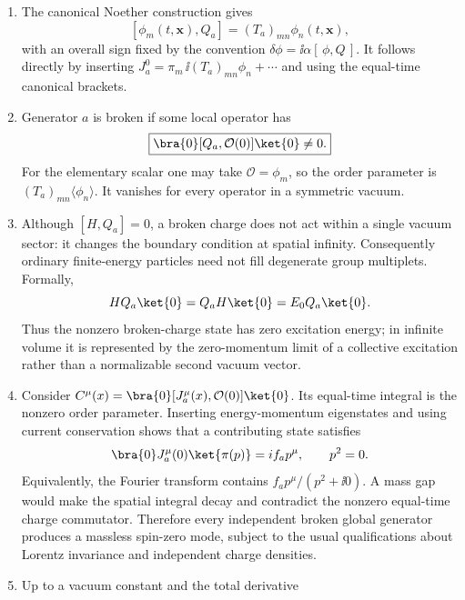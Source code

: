 
\begin{enumerate}
  \begin{enumerate}
    \item[(a)] The canonical Noether construction gives
      \[
        [\phi_m(t,\mathbf x),Q_a]=(T_a)_{mn}\phi_n(t,\mathbf x),
      \]
      with an overall sign fixed by the convention
      \(\delta\phi=\ii\alpha[\,\phi,Q\,]\).  It follows directly by inserting
      \(J^0_a=\pi_m\,\ii(T_a)_{mn}\phi_n+\cdots\) and using the equal-time
      canonical brackets.
    \item[(b)] Generator \(a\) is broken if some local operator has
      \[
        \boxed{\bra{0}[Q_a,\mathcal O(0)]\ket{0}\ne0.}
      \]
      For the elementary scalar one may take
      \(\mathcal O=\phi_m\), so the order parameter is
      \((T_a)_{mn}\langle\phi_n\rangle\).  It vanishes for every operator in
      a symmetric vacuum.
    \item[(c)] Although \([H,Q_a]=0\), a broken charge does not act within
      a single vacuum sector: it changes the boundary condition at spatial
      infinity.  Consequently ordinary finite-energy particles need not
      fill degenerate group multiplets.  Formally,
      \[
        H Q_a\ket{0}=Q_aH\ket{0}=E_0Q_a\ket{0} .
      \]
      Thus the nonzero broken-charge state has zero excitation energy; in
      infinite volume it is represented by the zero-momentum limit of a
      collective excitation rather than a normalizable second vacuum
      vector.
    \item[(d)] Consider
      \(C^\mu(x)=\bra{0}[J^\mu_a(x),\mathcal O(0)]\ket{0}\).
      Its equal-time integral is the nonzero order parameter.  Inserting
      energy-momentum eigenstates and using current conservation shows that
      a contributing state satisfies
      \[
        \bra{0}J^\mu_a(0)\ket{\pi(p)}=if_a p^\mu,
        \qquad p^2=0.
      \]
      Equivalently, the Fourier transform contains
      \(f_a p^\mu/(p^2+\ii0)\).  A mass gap would make the spatial integral
      decay and contradict the nonzero equal-time charge commutator.
      Therefore every independent broken global generator produces a
      massless spin-zero mode, subject to the usual qualifications about
      Lorentz invariance and independent charge densities.
    \item[(e)] Up to a vacuum constant and the total derivative

\end{enumerate}
\end{enumerate}
